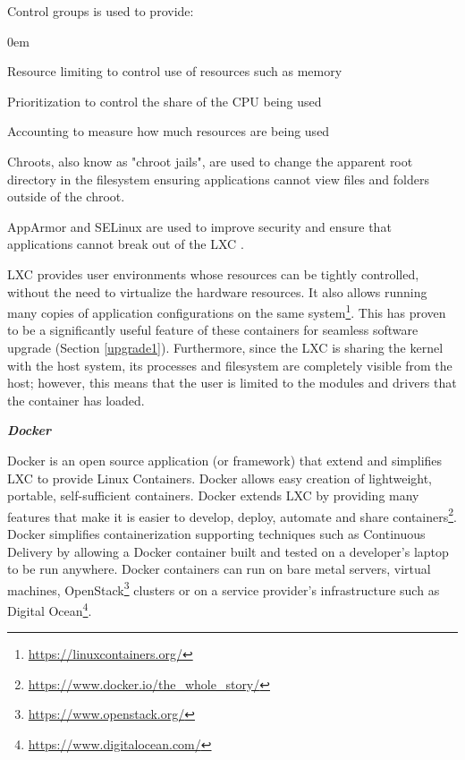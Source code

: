 \documentclass[a4paper,11pt,twoside]{report}
\begin{document}
\noindent 
Control groups is used to provide:

\begin{list}{-}{}
  \itemsep0em
  \item Resource limiting to control use of resources such as memory
  \item Prioritization to control the share of the CPU being used
  \item Accounting to measure how much resources are being used
  \end{list}

\noindent
Chroots, also know as "chroot jails", are used to change the apparent root directory in the filesystem ensuring applications cannot view files and folders outside of the chroot.

AppArmor and SELinux are used to improve security and ensure that applications cannot break out of the LXC \cite{security}.

LXC provides user environments whose resources can be tightly controlled, without the need to virtualize the hardware resources. It also allows running many copies of application configurations on the same system\footnote{\url{https://linuxcontainers.org/}}. This has proven to be a significantly useful feature of these containers for seamless software upgrade (Section \ref{upgrade1}). Furthermore, since the LXC is sharing the kernel with the host system, its processes and filesystem are completely visible from the host; however, this means that the user is limited to the modules and drivers that the container has loaded. \bigskip


\noindent
\textbf{\textit{Docker}}

\noindent
Docker is an open source application (or framework) that extend and simplifies LXC to provide Linux Containers. Docker allows easy creation of lightweight, portable, self-sufficient containers. Docker extends LXC by providing many features that make it is easier to develop, deploy, automate and share containers\footnote{\label{dockerB} \url{https://www.docker.io/the_whole_story/}}. Docker simplifies containerization supporting techniques such as Continuous Delivery by allowing a Docker container built and tested on a developer's laptop to be run anywhere. Docker containers can run on bare metal servers, virtual machines, OpenStack\footnote{\url{https://www.openstack.org/}} clusters or on a service provider's infrastructure such as Digital Ocean\footnote{\url{https://www.digitalocean.com/}}. 
\end{document}
